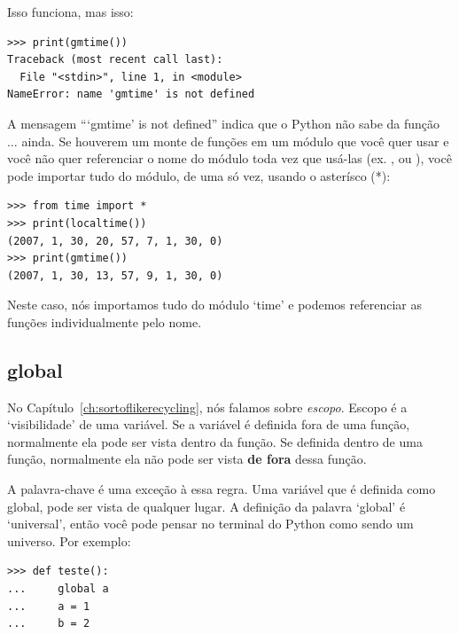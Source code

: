 \noindent
Isso funciona, mas isso:

\begin{listing}
\begin{verbatim}
>>> print(gmtime())
Traceback (most recent call last):
  File "<stdin>", line 1, in <module>
NameError: name 'gmtime' is not defined
\end{verbatim}
\end{listing}

A mensagem ```gmtime' is not defined'' indica que o Python não sabe da função $\ldots$ ainda. Se houverem um monte de funções em um módulo que você quer usar e você não quer referenciar o nome do módulo toda vez que usá-las (ex. , ou ), você pode importar tudo do módulo, de uma só vez, usando o asterísco (*):

\begin{listingignore}
\begin{verbatim}
>>> from time import *
>>> print(localtime())
(2007, 1, 30, 20, 57, 7, 1, 30, 0)
>>> print(gmtime())
(2007, 1, 30, 13, 57, 9, 1, 30, 0)
\end{verbatim}
\end{listingignore}

Neste caso, nós importamos tudo do módulo `time' e podemos referenciar as funções individualmente pelo nome.

\subsection*{global}

No Capítulo~\ref{ch:sortoflikerecycling}, nós falamos sobre \emph{escopo}. Escopo é a `visibilidade' de uma variável. Se a variável é definida fora de uma função, normalmente ela pode ser vista dentro da função. Se definida dentro de uma função, normalmente ela não pode ser vista \textbf{de fora} dessa função.
\par
A palavra-chave  é uma exceção à essa regra. Uma variável que é definida como global, pode ser vista de qualquer lugar. A definição da palavra `global' é `universal', então você pode pensar no terminal do Python como sendo um universo. Por exemplo:

\begin{listing}
\begin{verbatim}
>>> def teste():
...     global a
...     a = 1
...     b = 2
\end{verbatim}
\end{listing}

